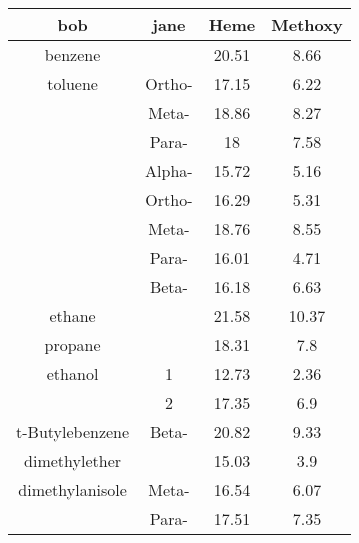\begin{table}[H]
\centering
\label{table:heme_methoxy}
\begin{tabular}{|c|c|c|c|}
\hline
bob & jane & Heme & Methoxy \\
\hline
benzene &  & 20.51 & 8.66 \\
toluene & Ortho- & 17.15 & 6.22 \\
 & Meta- & 18.86 & 8.27 \\
 & Para- & 18 & 7.58 \\
 & Alpha- & 15.72 & 5.16 \\
 & Ortho- & 16.29 & 5.31 \\
 & Meta- & 18.76 & 8.55 \\
 & Para- & 16.01 & 4.71 \\
 & Beta- & 16.18 & 6.63 \\
ethane &  & 21.58 & 10.37 \\
propane &  & 18.31 & 7.8 \\
ethanol & 1 & 12.73 & 2.36 \\
 & 2 & 17.35 & 6.9 \\
t-Butylebenzene & Beta- & 20.82 & 9.33 \\
dimethylether &  & 15.03 & 3.9 \\
dimethylanisole & Meta- & 16.54 & 6.07 \\
 & Para- & 17.51 & 7.35
\hline
\end{tabular}
\caption{}
\end{table}
